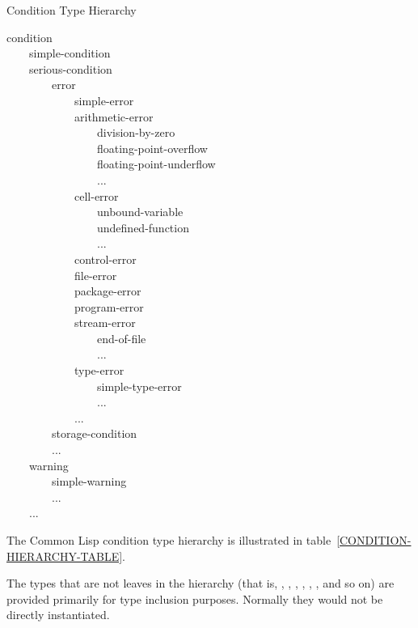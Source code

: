\begin{table}[t]
\caption{Condition Type Hierarchy}
\label{CONDITION-HIERARCHY-TABLE}
\begin{lisp}
condition \\
~~~~simple-condition \\
~~~~serious-condition \\
~~~~~~~~error \\
~~~~~~~~~~~~simple-error \\
~~~~~~~~~~~~arithmetic-error \\
~~~~~~~~~~~~~~~~division-by-zero \\
~~~~~~~~~~~~~~~~floating-point-overflow \\
~~~~~~~~~~~~~~~~floating-point-underflow \\
~~~~~~~~~~~~~~~~... \\
~~~~~~~~~~~~cell-error \\
~~~~~~~~~~~~~~~~unbound-variable \\
~~~~~~~~~~~~~~~~undefined-function \\
~~~~~~~~~~~~~~~~... \\
~~~~~~~~~~~~control-error \\
~~~~~~~~~~~~file-error \\
~~~~~~~~~~~~package-error \\
~~~~~~~~~~~~program-error \\
~~~~~~~~~~~~stream-error \\
~~~~~~~~~~~~~~~~end-of-file \\
~~~~~~~~~~~~~~~~... \\
~~~~~~~~~~~~type-error \\
~~~~~~~~~~~~~~~~simple-type-error \\
~~~~~~~~~~~~~~~~... \\
~~~~~~~~~~~~... \\
~~~~~~~~storage-condition \\
~~~~~~~~... \\
~~~~warning \\
~~~~~~~~simple-warning \\
~~~~~~~~... \\
~~~~...
\end{lisp}
\vfill
\end{table}

The Common Lisp condition type hierarchy is illustrated in
table~\ref{CONDITION-HIERARCHY-TABLE}.

The types that are not leaves in the hierarchy (that is, ,
, , , ,
, and so on) are provided primarily for type inclusion
purposes. Normally they would not be directly instantiated.


